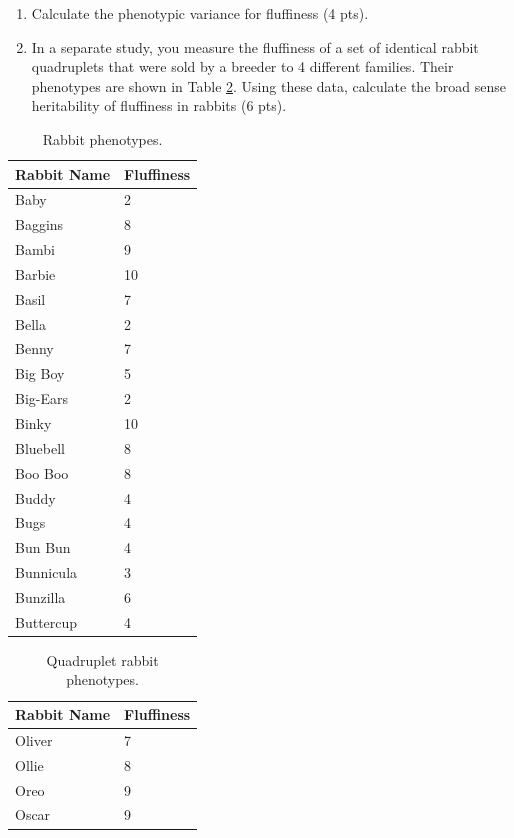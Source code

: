 \documentclass[]{article}
\begin{document}
\begin{enumerate}
\begin{enumerate}
\item Calculate the phenotypic variance for fluffiness (4 pts).
\item In a separate study, you measure the fluffiness of a set of identical rabbit quadruplets that were sold by a breeder to 4 different families.  Their phenotypes are shown in Table \ref{clones}. Using these data, calculate the broad sense heritability of fluffiness in rabbits (6 pts).
\end{enumerate}

\begin{table}[h!]
\caption[]{Rabbit phenotypes.}
\begin{center}
\begin{tabular}{ll}
Rabbit Name & Fluffiness \\  \hline
Baby & 2\\
Baggins & 8\\
Bambi & 9\\
Barbie & 10\\
Basil & 7\\
Bella & 2\\
Benny & 7\\
Big Boy & 5\\
Big-Ears & 2\\
Binky & 10\\
Bluebell & 8\\
Boo Boo & 8\\
Buddy & 4\\
Bugs & 4\\
Bun Bun & 4\\
Bunnicula & 3\\
Bunzilla & 6\\
Buttercup & 4\\
\end{tabular}
\end{center}
\label{fluffy}
\end{table}

\begin{table}[h!]
\caption[]{Quadruplet rabbit phenotypes.}
\begin{center}
\begin{tabular}{ll}
Rabbit Name & Fluffiness \\  \hline
Oliver & 7\\
Ollie & 8\\
Oreo & 9\\
Oscar & 9\\
\end{tabular}
\end{center}
\label{clones}
\end{table}


\end{enumerate}
\end{document}
